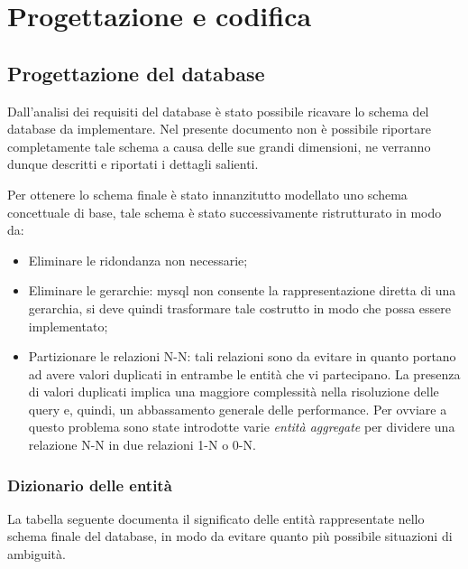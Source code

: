 
\chapter{Progettazione e codifica}
\label{cap:progettazione-codifica}
\section{Progettazione del database}
\label{sec:progettazione}
Dall'analisi dei requisiti del database è stato possibile ricavare lo schema del database da implementare. Nel presente documento non è possibile riportare completamente tale schema a causa delle sue grandi dimensioni, ne verranno dunque descritti e riportati i dettagli salienti. \bigskip

Per ottenere lo schema finale è stato innanzitutto modellato uno schema concettuale di base, tale schema è stato successivamente ristrutturato in modo da:

\begin{itemize}
	\item Eliminare le \gls{ridondanza}\glsfirstoccur{} non necessarie;
	\item Eliminare le gerarchie: \gls{mysql}\glsfirstoccur{} non consente la rappresentazione diretta di una gerarchia, si deve quindi trasformare tale costrutto in modo che possa essere implementato;
	\item Partizionare le relazioni N-N: tali relazioni sono da evitare in quanto portano ad avere valori duplicati in entrambe le entità che vi partecipano. La presenza di valori duplicati implica una maggiore complessità nella risoluzione delle query e, quindi, un abbassamento generale delle performance. Per ovviare a questo problema sono state introdotte varie \textit{entità aggregate} per dividere una relazione N-N in due relazioni 1-N o 0-N.
\end{itemize}

\subsection{Dizionario delle entità} %
La tabella seguente documenta il significato delle entità rappresentate nello schema finale del database, in modo da evitare quanto più possibile situazioni di ambiguità. \\

